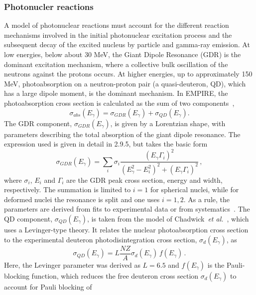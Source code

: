 \documentclass[twocolumn,amsmath,amssymb,10pt,groupedaddress,a4paper]{revtex4}
\begin{document}
\subsubsection{\label{sec:photonuclear} Photonucler reactions}
A model of photonuclear reactions must account for the different reaction
mechanisms involved in the initial photonuclear excitation process
and the subsequent decay of the excited nucleus by particle and gamma-ray
emission. At low energies, below about 30 MeV, the Giant Dipole Resonance
(GDR) is the dominant excitation mechanism, where a collective bulk
oscillation of the neutrons against the protons occurs. At higher
energies, up to approximately 150 MeV, photoabsorption on a neutron-proton
pair (a quasi-deuteron, QD), which has a large dipole moment, is the
dominant mechanism.
In EMPIRE, the photoabsorption cross section is calculated as the
sum of two components~\cite{PHNuc},
\begin{equation}
\sigma_{abs}(E_{\gamma})=\sigma_{GDR}(E_{\gamma})+\sigma_{QD}(E_{\gamma}).
\end{equation}
The GDR component, $\sigma_{GDR}(E_{\gamma})$, is given by a Lorentzian
shape, with parameters describing the total absorption of the giant
dipole resonance. The expression used is given in detail in 2.9.5,
but takes the basic form
\begin{equation}
\sigma_{GDR}(E_{\gamma})=\sum_{i}\sigma_{i}\frac{(E_{\gamma}\Gamma_{i})^{2}}{(E_{\gamma}^{2}-E_{i}^{2})^{2}+(E_{\gamma}\Gamma_{i})^{2}}\,,
\end{equation}
\noindent where $\sigma_{i}$, $E_{i}$ and $\Gamma_{i}$ are the GDR peak cross
section, energy and width, respectively. The summation is limited
to $i=1$ for spherical nuclei, while for deformed nuclei the resonance
is split and one uses $i=1,2$. As a rule, the parameters are derived
from fits to experimental data or from systematics~\cite{RIPL2}.
The QD component, $\sigma_{QD}(E_{\gamma})$, is taken from the model
of Chadwick~\emph{et al.}~\cite{chadQD}, which uses a Levinger-type
theory. It relates the nuclear photoabsorption cross section to the
experimental deuteron photodisintegration cross section, $\sigma_{d}(E_{\gamma})$,
as
\begin{equation}
\sigma_{QD}(E_{\gamma})=L\frac{NZ}{A}\sigma_{d}(E_{\gamma})\, f(E_{\gamma})\,.
\end{equation}
Here, the Levinger parameter was derived as $L=6.5$ and $f(E_{\gamma})$
is the Pauli-blocking function, which reduces the free deuteron cross
section $\sigma_{d}(E_{\gamma})$ to account for Pauli blocking of
\end{document}
